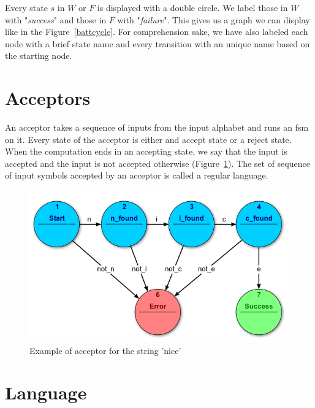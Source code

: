 \documentclass[12pt]{article}
\theoremstyle{definition}
\theoremstyle{definition}
\theoremstyle{remark}
\begin{document}
Every state $s$ in $W$ or $F$ is displayed with a double circle. We label those in $W$ with "\textit{success}" and those in $F$ with "\textit{failure}". This gives us a graph we can display like in the Figure~\ref{battcycle}. For comprehension sake, we have also labeled each node with a brief state name and every transition with an unique name based on the starting node.



\section{Acceptors}


An acceptor takes a sequence of inputs from the input alphabet and runs an \gls{fsm} on it. Every state of the acceptor is either and accept state or a reject state. When the computation ends in an accepting state, we say that the input is accepted and the input is not accepted otherwise (Figure~\ref{acceptor}). The set of sequence of input symbols accepted by an acceptor is called a regular language.

\begin{figure}
    \centering
    \includegraphics[scale=0.8]{acceptor.png}
    \caption{Example of acceptor for the string 'nice'~\cite{FSM:2017}}
    \label{acceptor}
\end{figure}



\section{Language}
\end{document}
